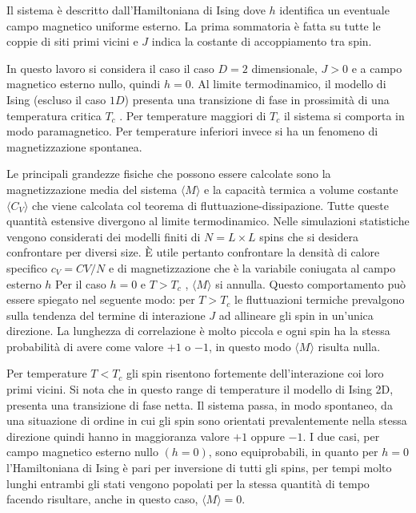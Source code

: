 \documentclass[a4paper,12pt]{article}
\begin{document}
Il sistema è descritto dall’Hamiltoniana di Ising
dove $h$ identifica un eventuale campo magnetico uniforme esterno. La prima sommatoria è fatta su tutte le coppie di siti primi vicini e $J$ indica la costante di accoppiamento tra spin. 

In questo lavoro si considera il caso il caso $D = 2$ dimensionale, $J > 0$ e a campo magnetico esterno nullo, quindi $h = 0$. Al limite termodinamico, il modello di Ising (escluso il caso $1D$) presenta una transizione di fase in prossimità di una temperatura critica $T_c$ . Per temperature maggiori di $T_c$ il sistema si comporta in modo paramagnetico. Per temperature inferiori invece si ha un fenomeno di magnetizzazione spontanea. 

Le principali grandezze fisiche che possono essere calcolate sono la magnetizzazione media del sistema $\langle M\rangle$  e la capacità termica a volume costante $\langle C_V \rangle$ che viene calcolata col teorema di fluttuazione-dissipazione. Tutte queste quantità estensive divergono al limite termodinamico. Nelle simulazioni statistiche vengono considerati dei modelli finiti di $N = L \times L$ spins che si desidera confrontare per diversi size. \`E utile pertanto confrontare la densità di calore specifico $c_V = CV /N$ e di magnetizzazione che è la variabile coniugata al campo esterno $h$
Per il caso $h = 0$ e $T > T_c$ , $\langle M \rangle$ si annulla. Questo comportamento può essere spiegato nel seguente modo: per $T > T_c$ le fluttuazioni termiche prevalgono sulla tendenza del termine di interazione $J$ ad allineare gli spin in un'unica direzione. La lunghezza di correlazione è molto piccola e ogni spin ha la stessa probabilità di avere come valore $+1$ o $-1$, in questo modo $\langle M \rangle$ risulta nulla. 

Per temperature $T < T_c$ gli spin risentono fortemente dell’interazione coi loro primi vicini. Si nota che in questo range di temperature il modello di Ising 2D, presenta una transizione di fase netta. Il sistema passa, in modo spontaneo, da una situazione di ordine in cui gli spin sono orientati prevalentemente nella stessa direzione quindi hanno in maggioranza valore $+1$ oppure $-1$. I due casi, per campo magnetico esterno nullo $(h = 0)$, sono equiprobabili, in quanto per $h = 0$ l’Hamiltoniana di Ising è pari per inversione di tutti gli spins, per tempi molto lunghi entrambi gli stati vengono popolati per la stessa quantità di tempo facendo risultare, anche in questo caso, $\langle M \rangle = 0$. 
\end{document}
